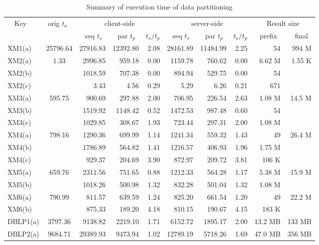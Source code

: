 \begin{table}[tbp]
\caption{Summary of execution time of data partitioning}
\label{Table:summary}
\small
\setlength{\doublerulesep}{.4pt}
\centering\begin{tabular}{l|c|rr@{~(}r@{)}|rr@{~(}r@{)}|rr}
\hline \hline
~~Key & orig $t_o$~ & \multicolumn{3}{c|}{client-side} & \multicolumn{3}{c|}{server-side} & \multicolumn{2}{c}{Result size} \\
	&       			& seq $t_s$~   	& par $t_p$~   	& $t_o/t_p$	& seq $t_s$~	& par $t_p$~	& $t_o/t_p$	& prefix~	& final~ \\
\hline
XM1(a)	& 25796.64			& 27916.83	& 12392.80	& 2.08		& 28161.89	& 11484.99	& 2.25		& 54		& 994 M \\
\hline
XM2(a)	& \multirow{3}{*}{1.33}		& 2996.85	& 959.18	& 0.00		& 1159.78	& 760.62	& 0.00		& 6.62 M	& \multirow{3}{*}{1.55 K} \\
XM2(b)	&				& 1018.59	& 707.38	& 0.00		& 894.94	& 529.75	& 0.00		& 54		&  \\
XM2(c)	&				& 3.43		& 4.56		& 0.29		& 5.29		& 6.26		& 0.21		& 671		&  \\
\hline
XM3(a)	& \multirow{3}{*}{595.75}	& 900.69	& 297.88	& 2.00		& 706.95	& 226.54	& 2.63		& 1.08 M	& \multirow{3}{*}{14.5 M} \\
XM3(b)	&				& 1519.92	& 1148.42	& 0.52		& 1472.53	& 987.48	& 0.60		& 54		&  \\
XM3(c)	&				& 1029.85	& 308.67	& 1.93		& 723.44	& 297.31	& 2.00		& 1.08 M	&  \\
\hline
XM4(a)	& \multirow{3}{*}{798.16}	& 1290.36	& 699.99	& 1.14		& 1241.34	& 559.32	& 1.43		& 49		& \multirow{3}{*}{26.4 M} \\
XM4(b)	&				& 1786.89	& 564.82	& 1.41		& 1216.57	& 406.93	& 1.96		& 1.75 M	&  \\
XM4(c)	&				& 929.37	& 204.69	& 3.90		& 872.97	& 209.72	& 3.81		& 106 K		&  \\
\hline
XM5(a)	& \multirow{2}{*}{659.76}	& 2311.56	& 751.65	& 0.88		& 1212.33	& 564.28	& 1.17		& 5.38 M	& \multirow{2}{*}{15.9 M} \\
XM5(b)	&				& 1018.26	& 500.98	& 1.32		& 832.28	& 501.04	& 1.32		& 1.08 M	&  \\
\hline
XM6(a)	& \multirow{2}{*}{790.99}	& 811.57	& 639.59	& 1.24		& 825.20	& 661.54	& 1.20		& 49		& \multirow{2}{*}{22.2 M} \\
XM6(b)	&				& 875.33	& 189.20	& 4.18		& 810.15	& 190.67	& 4.15		& 183 K		&  \\
\hline
DBLP1(a) & 3797.36 & 9138.82  & 2219.10 & 1.71    & 6152.72  & 1895.17 & 2.00    & 13.2 MB & 133 MB \\ 
\hline
DBLP2(a) & 9684.71 & 29389.93 & 9473.94 & 1.02    & 12789.19 & 5718.26 & 1.69    & 47.0 MB & 356 MB \\ 
\hline
\end{tabular}
\end{table}
